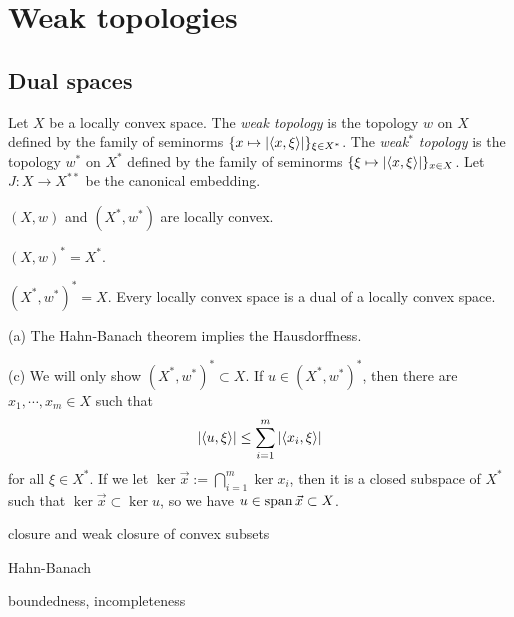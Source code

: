 \documentclass{../../large}
\begin{document}
\chapter{Weak topologies}
\section{Dual spaces}

\begin{prb}[Bidual]
\end{prb}

\begin{prb}
Let $X$ be a locally convex space.
The \emph{weak topology} is the topology $w$ on $X$ defined by the family of seminorms $\{x\mapsto|\langle x,\xi\rangle|\}_{\xi\in X^*}$.
The \emph{weak$^*$ topology} is the topology $w^*$ on $X^*$ defined by the family of seminorms $\{\xi\mapsto|\langle x,\xi\rangle|\}_{x\in X}$.
Let $J:X\to X^{**}$ be the canonical embedding.
\begin{parts}
\item $(X,w)$ and $(X^*,w^*)$ are locally convex.
\item $(X,w)^*=X^*$.
\item $(X^*,w^*)^*=X$. Every locally convex space is a dual of a locally convex space.
\end{parts}
\end{prb}
\begin{pf}
(a)
The Hahn-Banach theorem implies the Hausdorffness.

(c)
We will only show $(X^*,w^*)^*\subset X$.
If $u\in(X^*,w^*)^*$, then there are $x_1,\cdots,x_m\in X$ such that
\[|\langle u,\xi\rangle|\le\sum_{i=1}^m|\langle x_i,\xi\rangle|\]
for all $\xi\in X^*$.
If we let $\ker\vec x:=\bigcap_{i=1}^m\ker x_i$, then it is a closed subspace of $X^*$ such that $\ker\vec x\subset\ker u$, so we have $u\in\operatorname{span}\vec x\subset X$.
\end{pf}

\begin{prb}
closure and weak closure of convex subsets
\end{prb}
\begin{pf}
Hahn-Banach
\end{pf}

\begin{prb}[Polar]
\end{prb}


boundedness, incompleteness
\end{document}
